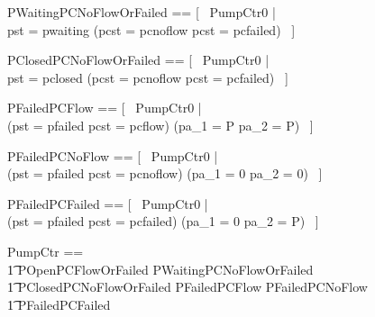 \documentclass{report} %
\begin{document}
\begin{zed}
  PWaitingPCNoFlowOrFailed == [~ PumpCtr0 | \\
      pst = pwaiting \implies (pcst = pcnoflow \lor pcst = pcfailed) ~]
\end{zed}

\begin{zed}
  PClosedPCNoFlowOrFailed == [~ PumpCtr0 | \\
      pst = pclosed \implies (pcst = pcnoflow \lor pcst = pcfailed) ~]
\end{zed}

\begin{zed}
  PFailedPCFlow == [~ PumpCtr0 | \\
      (pst = pfailed \land pcst = pcflow) \implies (pa\_1 = P \land pa\_2 = P) ~]
\end{zed}

\begin{zed}
  PFailedPCNoFlow == [~ PumpCtr0 | \\
      (pst = pfailed \land pcst = pcnoflow) \implies (pa\_1 = 0 \land pa\_2 = 0) ~]
\end{zed}

\begin{zed}
  PFailedPCFailed == [~ PumpCtr0 | \\
      (pst = pfailed \land pcst = pcfailed) \implies (pa\_1 = 0 \land pa\_2 = P) ~]
\end{zed}


\begin{zed}
  PumpCtr == \\ %
  \t1 POpenPCFlowOrFailed \land PWaitingPCNoFlowOrFailed \land \\ %
  \t1 PClosedPCNoFlowOrFailed \land PFailedPCFlow \land PFailedPCNoFlow \land  \\
  \t1 PFailedPCFailed
\end{zed}
\end{document}
